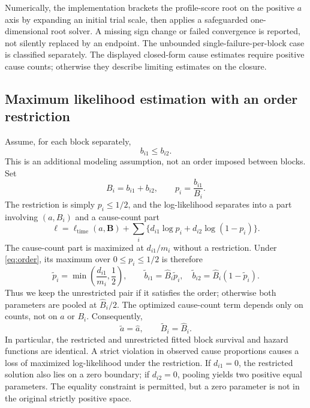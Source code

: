 \documentclass[a4paper,11pt]{article}
\begin{document}
Numerically, the implementation brackets the profile-score root on the positive $a$ axis by expanding an initial trial scale, then applies a safeguarded one-dimensional root solver. A missing sign change or failed convergence is reported, not silently replaced by an endpoint. The unbounded single-failure-per-block case is classified separately. The displayed closed-form cause estimates require positive cause counts; otherwise they describe limiting estimates on the closure.

\subsection{Maximum likelihood estimation with an order restriction}\label{sec:restricted}
Assume, for each block separately,
\begin{equation}\label{eq:order}
b_{i1}\le b_{i2}.
\end{equation}
This is an additional modeling assumption, not an order imposed between blocks. Set
\begin{equation}\label{eq:bp}
B_i=b_{i1}+b_{i2},\qquad p_i=\frac{b_{i1}}{B_i}.
\end{equation}
The restriction is simply $p_i\le1/2$, and the log-likelihood separates into a part involving $(a,B_i)$ and a cause-count part
\begin{equation}\label{eq:separation}
\ell=\ell_{\mathrm{time}}(a,\mathbf B)
+\sum_i\bigl\{d_{i1}\log p_i+d_{i2}\log(1-p_i)\bigr\}.
\end{equation}
The cause-count part is maximized at $d_{i1}/m_i$ without a restriction. Under \eqref{eq:order}, its maximum over $0\le p_i\le1/2$ is therefore
\begin{equation}\label{eq:phat}
\boxed{\widetilde p_i=\min\!\left(\frac{d_{i1}}{m_i},\frac12\right),\qquad
\widetilde b_{i1}=\widehat B_i\widetilde p_i,\quad
\widetilde b_{i2}=\widehat B_i(1-\widetilde p_i).}
\end{equation}
Thus we keep the unrestricted pair if it satisfies the order; otherwise both parameters are pooled at $\widehat B_i/2$. The optimized cause-count term depends only on counts, not on $a$ or $B_i$. Consequently,
\begin{equation}\label{eq:invariance}
\boxed{\widetilde a=\widehat a,\qquad\widetilde B_i=\widehat B_i.}
\end{equation}
In particular, the restricted and unrestricted fitted block survival and hazard functions are identical. A strict violation in observed cause proportions causes a loss of maximized log-likelihood under the restriction. If $d_{i1}=0$, the restricted solution also lies on a zero boundary; if $d_{i2}=0$, pooling yields two positive equal parameters. The equality constraint is permitted, but a zero parameter is not in the original strictly positive space.
\end{document}
